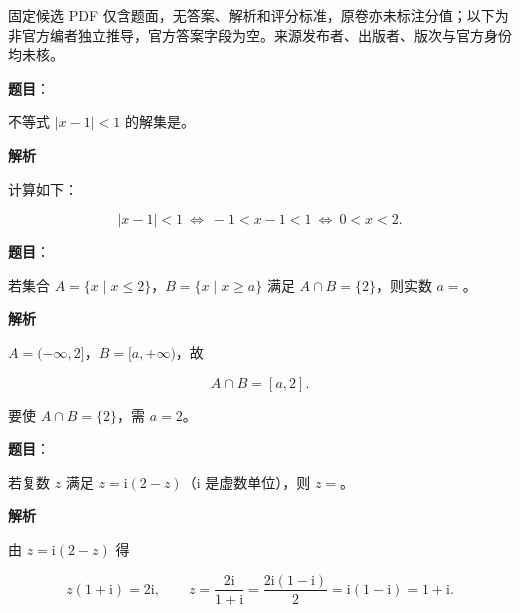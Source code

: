 

\begin{gktip}
固定候选 PDF 仅含题面，无答案、解析和评分标准，原卷亦未标注分值；以下为非官方编者独立推导，官方答案字段为空。来源发布者、出版者、版次与官方身份均未核。
\end{gktip}

\begin{answer}

\textbf{题目}：

不等式 $|x-1|<1$ 的解集是\gkblank{}。

\textbf{解析}

计算如下：

\nopagebreak[4]
\[|x-1|<1\ \Longleftrightarrow\ -1<x-1<1\ \Longleftrightarrow\ 0<x<2.\]


\end{answer}
\begin{answer}

\textbf{题目}：

若集合 $A=\{x\mid x\leqslant2\}$，$B=\{x\mid x\geqslant a\}$ 满足 $A\cap B=\{2\}$，则实数 $a=$\gkblank{}。

\textbf{解析}

$A=(-\infty,2]$，$B=[a,+\infty)$，故

\nopagebreak[4]
\[A\cap B=[a,2].\]

要使 $A\cap B=\{2\}$，需 $a=2$。


\end{answer}
\begin{answer}

\textbf{题目}：

若复数 $z$ 满足 $z=\mathrm i(2-z)$（$\mathrm i$ 是虚数单位），则 $z=$\gkblank{}。

\textbf{解析}

由 $z=\mathrm i(2-z)$ 得

\nopagebreak[4]
\[z(1+\mathrm i)=2\mathrm i,\qquad z=\frac{2\mathrm i}{1+\mathrm i}=\frac{2\mathrm i(1-\mathrm i)}2=\mathrm i(1-\mathrm i)=1+\mathrm i.\]


\end{answer}
